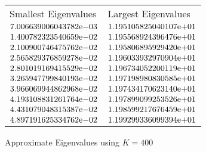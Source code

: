\begin{enumerate}
\begin{figure}[tbh]
 \centering    
\begin{tabular}{ ||p{6cm}||p{6cm}|}
\hline
 Smallest Eigenvalues & Largest Eigenvalues \\ \hhline{|=|=|}    
\hline
${7.006639006043782}\mathrm{e}{-03}$ & ${1.195105825040107}\mathrm{e}{+01}$ \\  
${1.400782323540659}\mathrm{e}{-02}$ & ${1.195568924396476}\mathrm{e}{+01}$ \\  
${2.100900746475762}\mathrm{e}{-02}$ & ${1.195806895929420}\mathrm{e}{+01}$ \\  
${2.565829376859278}\mathrm{e}{-02}$ & ${1.196033932970904}\mathrm{e}{+01}$ \\  
${2.801019169415529}\mathrm{e}{-02}$ & ${1.196734052200119}\mathrm{e}{+01}$ \\  
${3.265947799840193}\mathrm{e}{-02}$ & ${1.197198980830585}\mathrm{e}{+01}$ \\  
${3.966069944862968}\mathrm{e}{-02}$ & ${1.197434170623140}\mathrm{e}{+01}$ \\  
${4.193108831261764}\mathrm{e}{-02}$ & ${1.197899099253526}\mathrm{e}{+01}$ \\  
${4.431079048315387}\mathrm{e}{-02}$ & ${1.198599217676459}\mathrm{e}{+01}$ \\  
${4.897191625334762}\mathrm{e}{-02}$ & ${1.199299336099394}\mathrm{e}{+01}$ \\  
\hline  
\end{tabular} 
\caption{Approximate Eigenvalues using $K = 400$}
   \label{tab:app_eig_400}
\end{figure} 


\end{enumerate}

